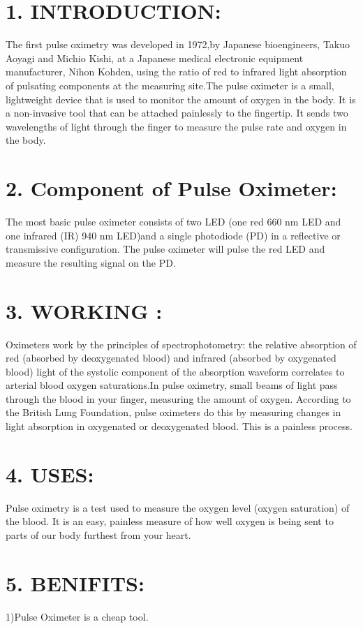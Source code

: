 \documentclass[12pt]{article}
\begin{document}
\section*{1. INTRODUCTION:}
 The first pulse oximetry was developed in 1972,by Japanese bioengineers, Takuo Aoyagi and Michio Kishi, at a Japanese medical electronic equipment manufacturer, Nihon Kohden, using the ratio of red to infrared light absorption of pulsating components at the measuring site.The pulse oximeter is a small, lightweight device that is used to monitor the amount of oxygen in the body. It is a non-invasive tool that can be attached painlessly to the fingertip. It sends two wavelengths of light through the finger to measure the pulse rate and oxygen in the body.
 

 \section*{2. Component of Pulse Oximeter:}
   The most basic pulse oximeter consists of two LED (one red 660 nm LED and one infrared (IR) 940 nm LED)and a single photodiode (PD) in a reflective or transmissive configuration. The pulse oximeter will pulse the red LED and measure the resulting signal on the PD.
   
\section*{3.  WORKING :}
 Oximeters work by the principles of spectrophotometry: the relative absorption of red (absorbed by deoxygenated blood) and infrared (absorbed by oxygenated blood) light of the systolic component of the absorption waveform correlates to arterial blood oxygen saturations.In pulse oximetry, small beams of light pass through the blood in your finger, measuring the amount of oxygen. According to the British Lung Foundation, pulse oximeters do this by measuring changes in light absorption in oxygenated or deoxygenated blood. This is a painless process. 
 
 \section*{4. USES:}
  Pulse oximetry is a test used to measure the oxygen level (oxygen saturation) of the blood. It is an easy, painless measure of how well oxygen is being sent to parts of our body furthest from your heart.
  
  
  \section*{5. BENIFITS:} 
  1)Pulse Oximeter is a cheap tool.
  
\end{document}
